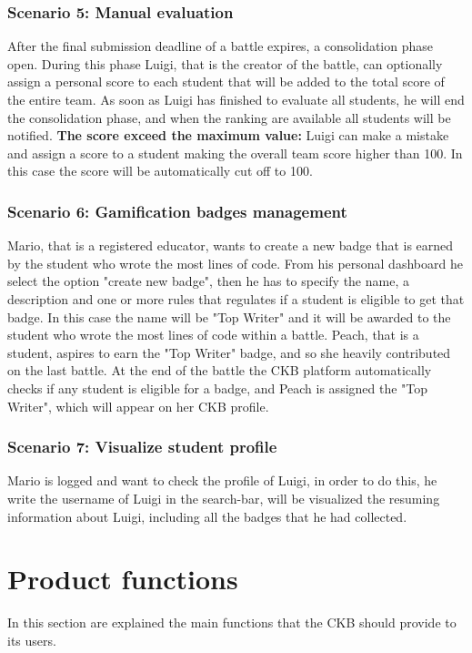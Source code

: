 \subsubsection{Scenario 5: Manual evaluation}
After the final submission deadline of a battle expires, a consolidation phase open. During this phase Luigi, that is the creator of the battle, can optionally assign a personal score to each student that will be added to the total score of the entire team.
As soon as Luigi has finished to evaluate all students, he will end the consolidation phase, and when the ranking are available all students will be notified.\newline
\textbf{The score exceed the maximum value:} Luigi can make a mistake and assign a score to a student making the overall team score higher than 100. In this case the score will be automatically cut off to 100.

\subsubsection{Scenario 6: Gamification badges management}
Mario, that is a registered educator, wants to create a new badge that is earned by the student who wrote the most lines of code. From his personal dashboard he select the option "create new badge", then he has to specify the name, a description and one or more rules that regulates if a student is eligible to get that badge. In this case the name will be "Top Writer" and it will be awarded to the student who wrote the most lines of code within a battle. \newline
Peach, that is a student, aspires to earn the "Top Writer" badge, and so she heavily contributed on the last battle. At the end of the battle the CKB platform automatically checks if any student is eligible for a badge, and Peach is assigned the "Top Writer", which will appear on her CKB profile.

\subsubsection{Scenario 7: Visualize student profile}
Mario is logged and want to check the profile of Luigi, in order to do this, he write the username of Luigi in the search-bar, will be visualized the resuming information about Luigi, including all the badges that he had collected.

\clearpage

\section{Product functions}\label{desc:prodFunc}
In this section are explained the main functions that the CKB should provide to its users.
